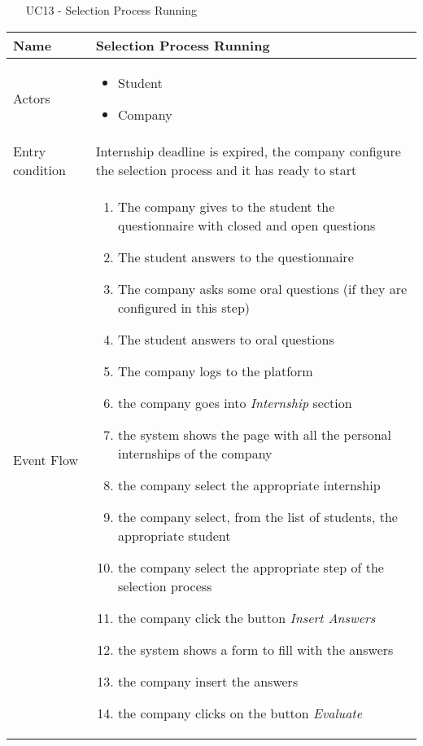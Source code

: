 				\begin{table} [H]
					\centering
					\begin{itemize}
						\item [UC13] - Selection Process Running
					\end{itemize}
					\begin{tabular}{|| P{7.5cm} | P{7.5cm} ||}
						\hline
						Name & Selection Process Running \\
						\hline
						Actors & \parbox{5cm}{\begin{itemize}
								\item Student
								\item Company
							\end{itemize}
						} \\
						\hline
						Entry condition & Internship deadline is expired, the company configure the selection process and it has ready to start \\
						\hline
						Event Flow & \parbox{5cm}{\begin{enumerate}
								\item The company gives to the student the questionnaire with closed and open questions
								\item The student answers to the questionnaire
								\item The company asks some oral questions (if they are configured in this step)
								\item The student answers to oral questions
								\item The company logs to the platform 
								\item the company goes into \textit{Internship} section
								\item the system shows the page with all the personal internships of the company
								\item the company select the appropriate internship 
								\item the company select, from the list of students, the appropriate student
								\item the company select the appropriate step of the selection process
								\item the company click the button \textit{Insert Answers}
								\item the system shows a form to fill with the answers
								\item the company insert the answers
								\item the company clicks on the button \textit{Evaluate}

\end{enumerate}}
\end{tabular}
\end{table}
